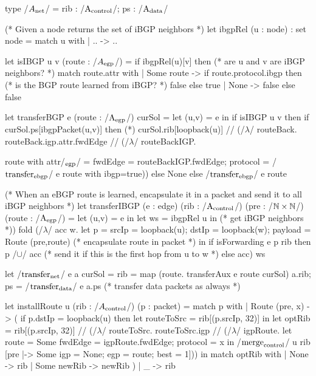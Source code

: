 \documentclass[sigconf,10pt]{acmart}
\begin{document}
\begin{listing}[ht]
  \begin{ocamlcode}
    type /$A_{\net}$/ = { rib : /$\A_{\control}$/; ps : /$\A_{\data}$/ }

    (* Given a node returns the set of iBGP neighbors *)
    let ibgpRel (u : node) : set node =
      match u with
      | .. -> {..}

    let isIBGP u v (route : /$A_{\egp}$/) =
      if ibgpRel(u)[v] then (* are u and v are iBGP neighbors? *)
        match route.attr with
        | Some route ->
          if route.protocol.ibgp then (* is the BGP route learned from iBGP? *)
            false 
          else
            true
        | None -> false
     else
       false   

    let transferBGP e (route : /$\A_{\egp}$/) curSol =
      let (u,v) = e  in
      if isIBGP u v then
        if curSol.ps[ibgpPacket(u,v)] then (*)
           curSol.rib[loopback(u)] /\bind/
              (/$\lambda$/ routeBack. 
                routeBack.igp.attr.fwdEdge /\bind/
                  (/$\lambda$/ routeBackIGP.
                  { route with attr/$_{\egp}$/ = { fwdEdge = routeBackIGP.fwdEdge;
                                                                protocol = /$\transfer_{\ebgp}$/ e {route with ibgp=true}}))
         else
            None
      else
         /$\transfer_{\ebgp}$/ e route

         (* When an eBGP route is learned, encapsulate it in a packet and send it to all iBGP
       neighbors *)
    let transferIBGP (e : edge) (rib : /$\A_{\control}$/) (pre : /$\nat \times \nat$/) (route : /$\A_{\egp}$/) =
      let (u,v) = e in
      let ws = ibgpRel u in (* get iBGP neighbors *))
      fold (/$\lambda$/ acc w.
        let p = { srcIp = loopback(u);
                     dstIp = loopback(w);
                     payload = Route (pre,route) } (* encapsulate route in packet *)
        in
        if isForwarding e p rib then
          {p} /$\cup$/ acc (* send it if this is the first hop from u to w *)
        else
          acc) {} ws


          
    let /$\transfer_{\net}$/ e a curSol =
      { rib = map (\lambda route. transferAux e route curSol) a.rib;
        ps = /$\transfer_{\data}$/ e a.ps (* transfer data packets as always *)
      }
  
    let installRoute u (rib : /$A_{\control}$/) (p : packet) =
      match p with
      | Route (pre, x) -> (
        if p.dstIp = loopback(u) then
          let routeToSrc = rib[(p.srcIp, 32)] in
          let optRib =
            rib[(p.srcIp, 32)] /\bind/
              (/$\lambda$/ routeToSrc.
                routeToSrc.igp /\bind/
                  (/$\lambda$/ igpRoute. 
                    let route = Some { fwdEdge = igpRoute.fwdEdge; protocol = x  } in
                    /$\merge_{\control}$/ u rib [pre |-> Some {igp = None; egp = route; best = 1}]))
          in
          match optRib with
          | None -> rib
          | Some newRib -> newRib
        )
      | _ -> rib  
          
}
\end{ocamlcode}
\end{listing}
\end{document}
